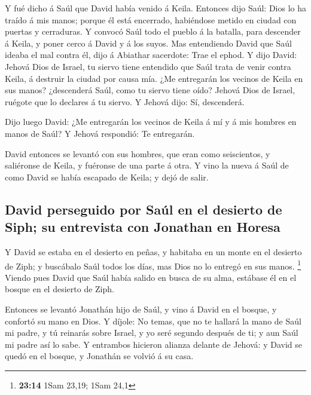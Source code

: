  Y fué dicho á Saúl que David había venido á Keila.
Entonces dijo Saúl: Dios lo ha traído á mis manos; porque él está
encerrado, habiéndose metido en ciudad con puertas y cerraduras.
 Y convocó Saúl todo el pueblo á la batalla, para
descender á Keila, y poner cerco á David y á los suyos. 
Mas entendiendo David que Saúl ideaba el mal contra él, dijo á Abiathar
sacerdote: Trae el ephod.  Y dijo David: Jehová Dios de
Israel, tu siervo tiene entendido que Saúl trata de venir contra Keila,
á destruir la ciudad por causa mía.  ¿Me entregarán los
vecinos de Keila en sus manos? ¿descenderá Saúl, como tu siervo tiene
oído? Jehová Dios de Israel, ruégote que lo declares á tu siervo. Y
Jehová dijo: Sí, descenderá.

 Dijo luego David: ¿Me entregarán los vecinos de Keila á
mí y á mis hombres en manos de Saúl? Y Jehová respondió: Te entregarán.

 David entonces se levantó con sus hombres, que eran como
seiscientos, y saliéronse de Keila, y fuéronse de una parte á otra. Y
vino la nueva á Saúl de como David se había escapado de Keila; y dejó de
salir.

\hypertarget{david-perseguido-por-sauxfal-en-el-desierto-de-siph-su-entrevista-con-jonathan-en-horesa}{%
\subsection{David perseguido por Saúl en el desierto de Siph; su
entrevista con Jonathan en
Horesa}\label{david-perseguido-por-sauxfal-en-el-desierto-de-siph-su-entrevista-con-jonathan-en-horesa}}

 Y David se estaba en el desierto en peñas, y habitaba en
un monte en el desierto de Ziph; y buscábalo Saúl todos los días, mas
Dios no lo entregó en sus manos. \footnote{\textbf{23:14} 1Sam 23,19;
  1Sam 24,1}  Viendo pues David que Saúl había salido en
busca de su alma, estábase él en el bosque en el desierto de Ziph.

 Entonces se levantó Jonathán hijo de Saúl, y vino á
David en el bosque, y confortó su mano en Dios.  Y
díjole: No temas, que no te hallará la mano de Saúl mi padre, y tú
reinarás sobre Israel, y yo seré segundo después de ti; y aun Saúl mi
padre así lo sabe.  Y entrambos hicieron alianza delante
de Jehová: y David se quedó en el bosque, y Jonathán se volvió á su
casa.

